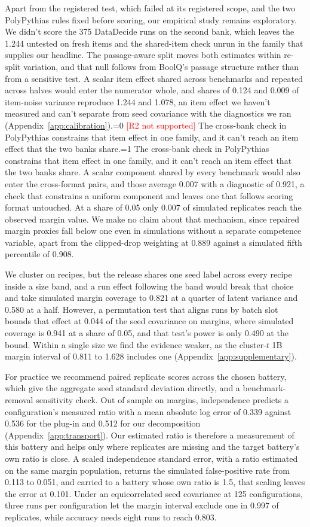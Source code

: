 \documentclass{article}
\newcommand{\pending}[1]{\textcolor{red}{[#1]}}
\newcommand{\Rtwocase}{0}
\newcommand{\outcome}[4]{\ifnum#1=0 \pending{#3} #4\else\ifnum#1=#2 #4\fi\fi}
\begin{document}
Apart from the registered test, which failed at its registered scope, and the two PolyPythias rules fixed before scoring, our empirical study remains exploratory. We didn't score the 375 DataDecide runs on the second bank, which leaves the 1.244 untested on fresh items and the shared-item check unrun in the family that supplies our headline. The passage-aware split moves both estimates within re-split variation, and that null follows from BoolQ's passage structure rather than from a sensitive test. A scalar item effect shared across benchmarks and repeated across halves would enter the numerator whole, and shares of 0.124 and 0.009 of item-noise variance reproduce 1.244 and 1.078, an item effect we haven't measured and can't separate from seed covariance with the diagnostics we ran (Appendix~\ref{app:calibration}).\outcome{\Rtwocase}{1}{R2 not supported}{ The cross-bank check in PolyPythias constrains that item effect in one family, and it can't reach an item effect that the two banks share.} A scalar component shared by every benchmark would also enter the cross-format pairs, and those average 0.007 with a diagnostic of 0.921, a check that constrains a uniform component and leaves one that follows scoring format untouched. At a share of 0.05 only 0.007 of simulated replicates reach the observed margin value. We make no claim about that mechanism, since repaired margin proxies fall below one even in simulations without a separate competence variable, apart from the clipped-drop weighting at 0.889 against a simulated fifth percentile of 0.908.

We cluster on recipes, but the release shares one seed label across every recipe inside a size band, and a run effect following the band would break that choice and take simulated margin coverage to 0.821 at a quarter of latent variance and 0.580 at a half. However, a permutation test that aligns runs by batch slot bounds that effect at 0.044 of the seed covariance on margins, where simulated coverage is 0.941 at a share of 0.05, and that test's power is only 0.490 at the bound. Within a single size we find the evidence weaker, as the cluster-$t$ 1B margin interval of 0.811 to 1.628 includes one (Appendix~\ref{app:supplementary}).

For practice we recommend paired replicate scores across the chosen battery, which give the aggregate seed standard deviation directly, and a benchmark-removal sensitivity check. Out of sample on margins, independence predicts a configuration's measured ratio with a mean absolute log error of 0.339 against 0.536 for the plug-in and 0.512 for our decomposition (Appendix~\ref{app:transport}). Our estimated ratio is therefore a measurement of this battery and helps only where replicates are missing and the target battery's own ratio is close. A scaled independence standard error, with a ratio estimated on the same margin population, returns the simulated false-positive rate from 0.113 to 0.051, and carried to a battery whose own ratio is 1.5, that scaling leaves the error at 0.101. Under an equicorrelated seed covariance at 125 configurations, three runs per configuration let the margin interval exclude one in 0.997 of replicates, while accuracy needs eight runs to reach 0.803.
\end{document}

